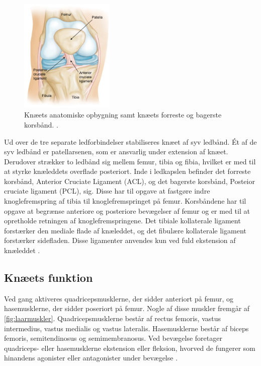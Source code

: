 \begin{figure}[H]
\centering
\includegraphics[width=0.4\textwidth]{figures/knae_anatomi}
\caption{Knæets anatomiske opbygning samt knæets forreste og bagerste korsbånd. \citep{aaos2014}.}
\label{fig:knae_anatomi}
\end{figure} 

\noindent
Ud over de tre separate ledforbindelser stabiliseres knæet af syv ledbånd. Ét af de syv ledbånd er patellarsenen, som er ansvarlig under extension af knæet. Derudover strækker to ledbånd sig mellem femur, tibia og fibia, hvilket er med til at styrke knæleddets overflade posteriort. 
Inde i ledkapslen befinder det forreste korsbånd, Anterior Cruciate Ligament (ACL), og det bagerste korsbånd, Posteior cruciate ligament (PCL), sig. Disse har til opgave at fastgøre indre knoglefremspring af tibia til knoglefremspringet på femur. 
Korsbåndene har til opgave at begrænse anteriore og posteriore bevægelser af femur og er med til at opretholde retningen af knoglefremspringene. 
Det tibiale kollaterale ligament forstærker den mediale flade af knæleddet, og det fibulære kollaterale ligament forstærker sidefladen. Disse ligamenter anvendes kun ved fuld ekstension af knæleddet \citep{martini2012}.

\subsection{Knæets funktion}
Ved gang aktiveres quadricepsmusklerne, der sidder anteriort på femur, og hasemusklerne, der sidder poseriort på femur. Nogle af disse muskler fremgår af \autoref{fig:laarmuskler}. Quadricepsmusklerne består af rectus femoris, vastus intermedius, vastus medialis og vastus lateralis. 
Hasemusklerne består af biceps femoris, semitendinosus og semimembranosus. 
Ved bevægelse foretager quadriceps- eller hasemusklerne ekstension eller fleksion, hvorved de fungerer som hinandens agonister eller antagonister under bevægelse \citep{martini2012}. 

